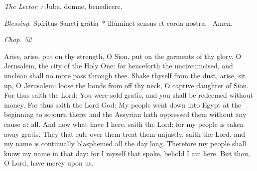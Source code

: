 {{  }

  {
    \medskip

    \emph{The Lector~:} Jube, domne, benedícere.

    \emph{Blessing.} Spíritus Sancti grátia~* illúminet sensus et corda nostra. \Rbar{}~Amen.
  }

  \bigskip
  {
    \hspace{10ex}{Lesson III.}\hfill\emph{Chap. 52}\hspace{10ex}

    \begin{parcolumns}[rulebetween,colwidths={1=.51\linewidth}]{2}
    {Arise, arise, put on thy strength, O Sion, put on the garments of thy glory, O Jerusalem, the city of the Holy One: for henceforth the uncircumcised, and unclean shall no more pass through thee.
      Shake thyself from the dust, arise, sit up, O Jerusalem: loose the bonds from off thy neck, O captive daughter of Sion.
      For thus saith the Lord: You were sold gratis, and you shall be redeemed without money.
      For thus saith the Lord God: My people went down into Egypt at the beginning to sojourn there: and the Assyrian hath oppressed them without any cause at all.
      And now what have I here, saith the Lord: for my people is taken away gratis. They that rule over them treat them unjustly, saith the Lord, and my name is continually blasphemed all the day long.
      Therefore my people shall know my name in that day: for I myself that spoke, behold I am here.
      But thou, O Lord, have mercy upon us.}
    \end{parcolumns}

  }

  {
    \medskip
  }
}